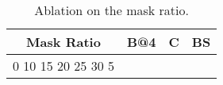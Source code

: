 \begin{table}[t]
\centering
\small
\caption{Ablation on the mask ratio.}
\label{tab:mask_ratio}
\begin{tabular}{crrr}
\toprule
Mask Ratio & B@4 & C & BS \\
\midrule
0%
10%
15%
20%
25%
30%
5%
\bottomrule
\end{tabular}
\end{table}
